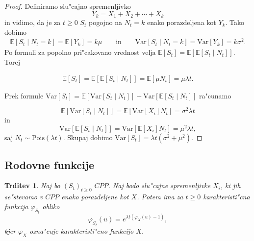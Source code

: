 \documentclass[12pt, a4paper, reqno]{amsart}
\theoremstyle{definition}
\theoremstyle{plain}
\newtheorem{trditev}[definicija]{Trditev}
\newcommand{\E}{\mathbb{E}}
\newcommand{\1}{\mathds{1}}
\newcommand{\Pois}[1]{\text{Pois}(#1)}
\newcommand{\Var}[1]{\text{Var}\left[#1\right]}
\begin{document}
        \begin{proof}

            Definiramo slu"cajno spremenljivko
            \begin{equation}
                Y_k = X_1 + X_2 + \cdots + X_k
                \label{eq:Y_k}
            \end{equation}
            in vidimo, da je za $t\geq0$ $S_t$ pogojno na $N_t = k$ enako porazdeljena 
            kot $Y_k$. Tako dobimo 
            \begin{align*}
            \E\left[S_t\mid N_t = k\right] = \E\left[Y_k\right] = k\mu \qquad \text{in} \qquad
            \Var{S_t\mid N_t = k} = \Var{Y_k} = k\sigma^2.
            \end{align*}
            Po formuli za popolno pri"cakovano vrednost velja 
            $\E\left[S_t\right] = \E\left[\E\left[S_t\mid N_t\right]\right]$. Torej

            \begin{align*}
                \E\left[S_t\right] = \E\left[\E\left[S_t\mid N_t\right]\right] = \E\left[\mu N_t\right] = \mu\lambda t.
            \end{align*}

            \noindent
            Prek formule $\Var{S_t} = \E\left[\Var{S_t\mid N_t}\right] + \Var{\E\left[S_t\mid N_t\right]}$ ra"cunamo 

            \begin{equation*}
                \E\left[\Var{S_t\mid N_t}\right] = \E\left[\Var{X_i}N_t\right] = \sigma^2\lambda t
            \end{equation*}
            in 
            \begin{equation*}
                \Var{\E\left[S_t\mid N_t\right]} = \Var{\E\left[X_i\right]N_t} = \mu^2\lambda t,
            \end{equation*}
            saj $N_t\sim\Pois{\lambda t}$. Skupaj dobimo $\Var{S_t} = \lambda t\left(\sigma^2 + \mu^2\right)$.
        \end{proof}

    \subsection{Rodovne funkcije}

    \begin{trditev}
        Naj bo $(S_t)_{t\geq0}$ $CPP$. Naj bodo slu"cajne spremenljivke $X_i$, ki jih se"stevamo v 
        $CPP$ enako porazdeljene kot $X$. Potem ima za $t\geq0$ karakteristi"cna funkcija $\varphi_{S_t}$ 
        obliko
        \begin{equation*}
            \varphi_{S_t}(u) = e^{\lambda t\left(\varphi_X(u) - 1\right)}, 
        \end{equation*}
        kjer $\varphi_X$ ozna"cuje karakteristi"cno funkcijo $X$.
        \label{trd:MomentGener}
    \end{trditev}
    
\end{document}
